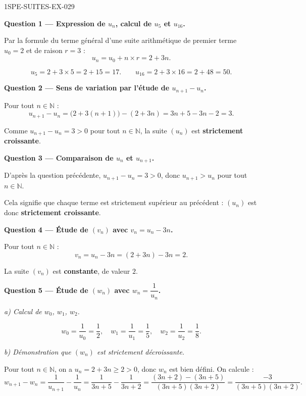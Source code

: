 \begin{corrige}{1SPE-SUITES-EX-029}

\textbf{Question 1 — Expression de $u_n$, calcul de $u_5$ et $u_{16}$.}

Par la formule du terme général d'une suite arithmétique de premier terme $u_0 = 2$ et de raison $r = 3$ :
\[
  u_n = u_0 + n \times r = 2 + 3n.
\]

\[
  u_5 = 2 + 3 \times 5 = 2 + 15 = 17. \qquad u_{16} = 2 + 3 \times 16 = 2 + 48 = 50.
\]

\medskip
\textbf{Question 2 — Sens de variation par l'étude de $u_{n+1} - u_n$.}

Pour tout $n \in \mathbb{N}$ :
\[
  u_{n+1} - u_n = \bigl(2 + 3(n+1)\bigr) - (2 + 3n) = 3n + 5 - 3n - 2 = 3.
\]


Comme $u_{n+1} - u_n = 3 > 0$ pour tout $n \in \mathbb{N}$, la suite $(u_n)$ est \textbf{strictement croissante}.

\medskip
\textbf{Question 3 — Comparaison de $u_n$ et $u_{n+1}$.}

D'après la question précédente, $u_{n+1} - u_n = 3 > 0$, donc $u_{n+1} > u_n$ pour tout $n \in \mathbb{N}$.

Cela signifie que chaque terme est strictement supérieur au précédent : $(u_n)$ est donc \textbf{strictement croissante}.

\medskip
\textbf{Question 4 — Étude de $(v_n)$ avec $v_n = u_n - 3n$.}

Pour tout $n \in \mathbb{N}$ :
\[
  v_n = u_n - 3n = (2 + 3n) - 3n = 2.
\]


La suite $(v_n)$ est \textbf{constante}, de valeur $2$.

\medskip
\textbf{Question 5 — Étude de $(w_n)$ avec $w_n = \dfrac{1}{u_n}$.}

\textit{a) Calcul de $w_0$, $w_1$, $w_2$.}

\[
  w_0 = \frac{1}{u_0} = \frac{1}{2}, \quad w_1 = \frac{1}{u_1} = \frac{1}{5}, \quad w_2 = \frac{1}{u_2} = \frac{1}{8}.
\]

\textit{b) Démonstration que $(w_n)$ est strictement décroissante.}

Pour tout $n \in \mathbb{N}$, on a $u_n = 2 + 3n \geq 2 > 0$, donc $w_n$ est bien défini. On calcule :
\[
  w_{n+1} - w_n = \frac{1}{u_{n+1}} - \frac{1}{u_n} = \frac{1}{3n+5} - \frac{1}{3n+2} = \frac{(3n+2) - (3n+5)}{(3n+5)(3n+2)} = \frac{-3}{(3n+5)(3n+2)}.
\]


\end{corrige}
